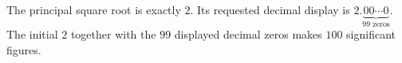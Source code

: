 The principal square root is exactly $2$. Its requested decimal display is $\boxed{2.\underbrace{00\cdots0}_{99\text{ zeros}}}$. The initial $2$ together with the $99$ displayed decimal zeros makes $100$ significant figures.

